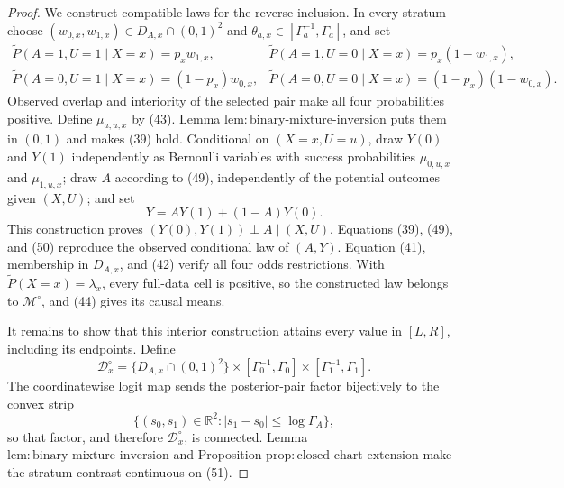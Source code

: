 \documentclass{article}
\begin{document}
\begin{proof}
We construct compatible laws for the reverse inclusion.  In every stratum choose \((w_{0,x},w_{1,x})\in D_{A,x}\cap(0,1)^2\) and \(\theta_{a,x}\in[\Gamma_a^{-1},\Gamma_a]\), and set
\[
\begin{array}{ll}
 \widetilde P(A=1,U=1\mid X=x)=p_xw_{1,x},
 &\widetilde P(A=1,U=0\mid X=x)=p_x(1-w_{1,x}),\\
 \widetilde P(A=0,U=1\mid X=x)=(1-p_x)w_{0,x},
 &\widetilde P(A=0,U=0\mid X=x)=(1-p_x)(1-w_{0,x}).
\end{array}                                                             \tag{49}
\]
Observed overlap and interiority of the selected pair make all four probabilities positive.  Define \(\mu_{a,u,x}\) by (43).  Lemma \(\mathrm{lem{:}binary\text{-}mixture\text{-}inversion}\) puts them in \((0,1)\) and makes (39) hold.  Conditional on \((X=x,U=u)\), draw \(Y(0)\) and \(Y(1)\) independently as Bernoulli variables with success probabilities \(\mu_{0,u,x}\) and \(\mu_{1,u,x}\); draw \(A\) according to (49), independently of the potential outcomes given \((X,U)\); and set
\[
 Y=AY(1)+(1-A)Y(0).                                                     \tag{50}
\]
This construction proves \((Y(0),Y(1))\perp A\mid(X,U)\).  Equations (39), (49), and (50) reproduce the observed conditional law of \((A,Y)\).  Equation (41), membership in \(D_{A,x}\), and (42) verify all four odds restrictions.  With \(\widetilde P(X=x)=\lambda_x\), every full-data cell is positive, so the constructed law belongs to \(\mathcal M^{\circ}\), and (44) gives its causal means.

It remains to show that this interior construction attains every value in \([L,R]\), including its endpoints.  Define
\[
 \mathcal D_x^{\circ}
 =\{D_{A,x}\cap(0,1)^2\}
  \times[\Gamma_0^{-1},\Gamma_0]
  \times[\Gamma_1^{-1},\Gamma_1].                                    \tag{51}
\]
The coordinatewise logit map sends the posterior-pair factor bijectively to the convex strip
\[
 \{(s_0,s_1)\in\mathbb R^2:
      |s_1-s_0|\leq\log\Gamma_A\},                                    \tag{52}
\]
so that factor, and therefore \(\mathcal D_x^{\circ}\), is connected.  Lemma \(\mathrm{lem{:}binary\text{-}mixture\text{-}inversion}\) and Proposition \(\mathrm{prop{:}closed\text{-}chart\text{-}extension}\) make the stratum contrast continuous on (51).


\end{proof}
\end{document}

